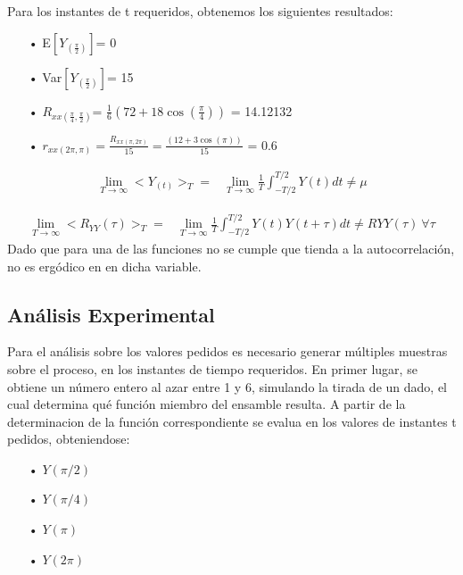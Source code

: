 Para los instantes de t requeridos, obtenemos los siguientes resultados:
\begin{enumerate}
	\item[•]E$\left[ Y_{(\frac{\pi}{2})}\right]$= 0 
	\item[•]Var$\left[Y_{(\frac{\pi}{2})}\right]$= 15
	\item[•]$R_{xx(\frac{\pi}{4},\frac{\pi}{2})}$= $\frac{1}{6} (72 + 18 \cos(\frac{\pi}{4}))$ = 14.12132
	\item[•]$r_{xx(2\pi,\pi)} = \frac{R_{xx(\pi,2\pi)}}{15} = \frac{ (12 + 3 \cos(\pi))}{15}$ = 0.6
\end{enumerate}

\begin{equation*}
\begin{split}
	\lim_{T\to\infty} < Y_{(t)} >_T = & \lim_{T\to\infty} \frac{1}{T} \int_{-T/2}^{T/2} Y(t) dt  \neq \mu 
\end{split}
\end{equation*}


\begin{equation*}
\begin{split}
	\lim_{T\to\infty} < R_{YY}(\tau) >_T = & \lim_{T\to\infty} \frac{1}{T} \int_{-T/2}^{T/2} Y(t) Y(t + \tau) dt \neq R{YY}(\tau) \ 	\forall \tau
\end{split}
\end{equation*}
Dado que para una de las funciones no se cumple que tienda a la autocorrelación, no es ergódico en en dicha variable.\\


\subsection{Análisis Experimental}

Para el análisis sobre los valores pedidos es necesario generar múltiples muestras sobre el proceso, en los instantes de tiempo requeridos. En primer lugar, se obtiene un número entero al azar entre 1 y 6, simulando la tirada de un dado, el cual determina qué función miembro del ensamble resulta.
A partir de la determinacion de la función correspondiente se evalua en los valores de instantes t pedidos, obteniendose:

\begin{enumerate}
   \item[•] $Y(\pi/2)$
   \item[•] $Y(\pi/4)$
   \item[•] $Y(\pi)$
   \item[•] $Y(2\pi)$
\end{enumerate}

